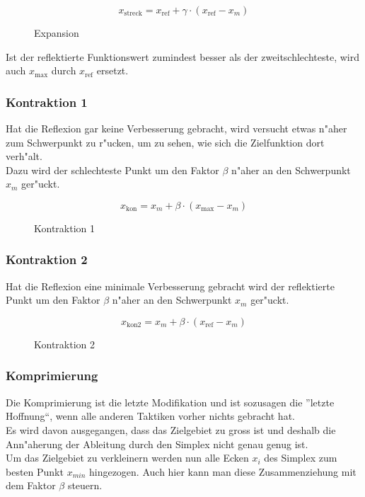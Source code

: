 \begin{equation}
x_{\text{streck}} = x_{\text{ref}} + \gamma \cdot (x_{\text{ref}}-x_{m})
\end{equation}
\begin{figure}[ht]
	\centering
  	\caption{Expansion}%
	\label{fig:Streckung}%
\end{figure}

Ist der reflektierte Funktionswert zumindest besser als der zweitschlechteste, wird auch $x_{\text{max}}$ durch $x_{\text{ref}}$ ersetzt.


\subsubsection{Kontraktion 1}

Hat die Reflexion gar keine Verbesserung gebracht, wird versucht etwas n"aher zum Schwerpunkt zu r"ucken, um zu sehen, wie sich die Zielfunktion dort verh"alt.\\
Dazu wird der schlechteste Punkt um den Faktor $\beta$ n"aher an den Schwerpunkt $x_m$ ger"uckt. 

\begin{equation}
x_{\text{kon}} = x_{m} + \beta \cdot (x_{\text{max}}-x_{m})
\end{equation}

\begin{figure}[ht]
	\centering
  	\caption{Kontraktion 1}%
	\label{fig:Kon1}%
\end{figure}

\subsubsection{Kontraktion 2}

Hat die Reflexion eine minimale Verbesserung gebracht wird der reflektierte Punkt um den Faktor $\beta$ n"aher an den Schwerpunkt $x_m$ ger"uckt. 

\begin{equation}
x_{\text{kon2}} = x_{m} + \beta \cdot (x_{\text{ref}}-x_{m})
\end{equation}

\begin{figure}[ht]
	\centering
  	\caption{Kontraktion 2}%
	\label{fig:Kon2}%
\end{figure}

\subsubsection{Komprimierung}
Die Komprimierung ist die letzte Modifikation und ist sozusagen die ''letzte Hoffnung``, wenn alle anderen Taktiken vorher nichts gebracht hat.\\
Es wird davon ausgegangen, dass das Zielgebiet zu gross ist und deshalb die Ann"aherung der Ableitung durch den Simplex nicht genau genug ist.\\
Um das Zielgebiet zu verkleinern werden nun alle Ecken $x_i$ des Simplex zum besten Punkt $x_{min}$ hingezogen. Auch hier kann man diese Zusammenziehung mit dem Faktor $\beta$ steuern.  

